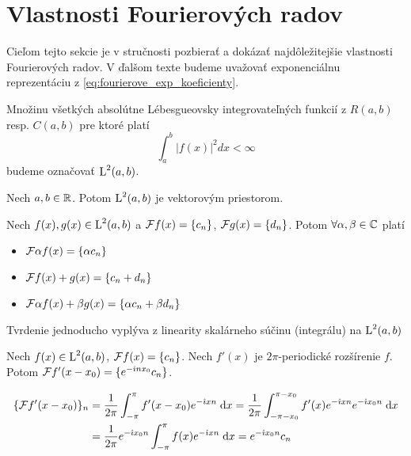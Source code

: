 \section{Vlastnosti Fourierových radov}
Cieľom tejto sekcie je v stručnosti pozbierať a dokázať
najdôležitejšie vlastnosti Fourierových radov. V ďalšom texte budeme
uvažovať exponenciálnu reprezentáciu z \eqref{eq:fourierove_exp_koeficienty}.

\begin{definicia}[$\LLab$]
    Množinu všetkých absolútne Lébesgueovsky integrovateľných 
    funkcií z $R(a,b)$ resp. $C(a,b)$ pre ktoré platí
    \begin{equation}
        \int_a^b |f(x)|^2 dx < \infty
    \end{equation}
    budeme označovať $\LLab$.
\end{definicia}

\begin{lema}
   Nech $a,b\in{\mathbb R}$. Potom $\LLab$ je vektorovým priestorom.
\end{lema}

\begin{veta}[Linearita]
Nech $f(x), g(x) \in \mbox{L}^2(a,b)$ a $\mathcal{F}{f(x)} = \{c_n\}$,
$\mathcal{F}{g(x)} = \{d_n\}$.
Potom $\forall \alpha,\beta \in \mathbb{C}$ platí
\begin{itemize}
    \item $\mathcal{F}{\alpha f(x)} = \{\alpha c_n\}$
    \item $\mathcal{F}{f(x) + g(x)} = \{c_n + d_n\}$
    \item $\mathcal{F}{\alpha f(x) + \beta g(x)} = \{\alpha c_n + \beta
    d_n\}$
\end{itemize}
\end{veta}
\begin{dokaz}
 Tvrdenie jednoducho vyplýva z linearity skalárneho súčinu
 (integrálu) na $\LLab$
\end{dokaz}

\begin{veta}
Nech $f(x) \in \mbox{L}^2(a,b)$, $\mathcal{F}{f(x)} = \{c_n\}$.
Nech $f'(x)$ je $2\pi$-periodické rozšírenie $f$. Potom
$\mathcal{F}{f'(x-x_0)} = \{ e^{-\hat{\imath} n x_0} c_n \}$.
\label{veta:time_shift}
\end{veta}
\begin{dokaz}
    \begin{equation*}
    \begin{split}
      \{\mathcal{F} f'(x-x_0)\}_n &= 
        \frac{1}{2\pi} \int_{-\pi}^{\pi} f'(x-x_0) e^{-\hat{\imath} x n} \; \mathrm{d} x 
        = \frac{1}{2\pi} \int_{-\pi - x_0}^{\pi - x_0} f'(x) e^{-\hat{\imath} x
            n} e^{-\hat{\imath} x_0 n} \; \mathrm{d} x \\
        &= \frac{1}{2\pi} e^{-\hat{\imath} x_0 n} \int_{-\pi}^{\pi} f(x) e^{-\hat{\imath} x n} \; \mathrm{d} x
         = e^{-\hat{\imath} x_0 n} c_n
    \end{split}
    \end{equation*}
\end{dokaz}

